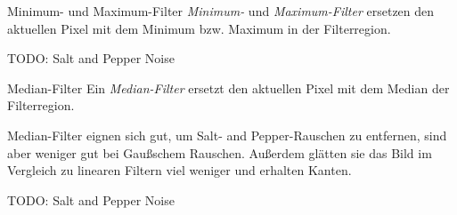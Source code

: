 \begin{defi}{Minimum- und Maximum-Filter}
    \emph{Minimum-} und \emph{Maximum-Filter} ersetzen den aktuellen Pixel mit dem Minimum bzw. Maximum in der Filterregion.

    TODO: Salt and Pepper Noise
\end{defi}

\begin{defi}{Median-Filter}
    Ein \emph{Median-Filter} ersetzt den aktuellen Pixel mit dem Median der Filterregion.

    Median-Filter eignen sich gut, um Salt- and Pepper-Rauschen zu entfernen, sind aber weniger gut bei Gaußschem Rauschen.
    Außerdem glätten sie das Bild im Vergleich zu linearen Filtern viel weniger und erhalten Kanten.

    TODO: Salt and Pepper Noise
\end{defi}